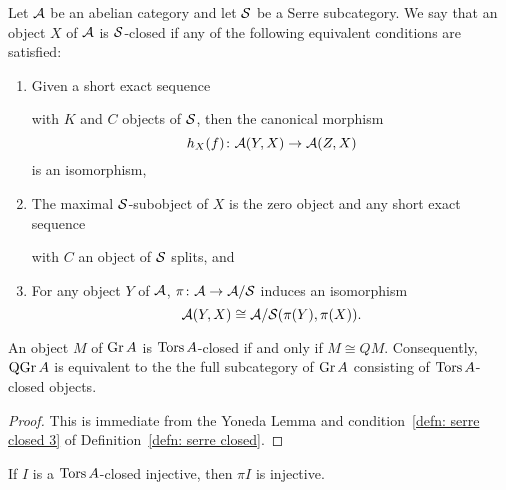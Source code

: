 \begin{definition}\label{defn: serre closed}
  Let \(\mathcal{A}\) be an abelian category and let \(\mathcal{S}\) be a Serre subcategory.
  We say that an object \(X\) of \(\mathcal{A}\) is \(\mathcal{S}\)-closed if any of the following equivalent conditions are satisfied:
  \begin{enumerate}
  \item\label{defn:serre closed 1}
    Given a short exact sequence 
    \begin{center}
    \end{center}
    with $K$ and $C$ objects of $\mathcal{S}$, then the canonical morphism
    $$h_X(f) \colon \mathcal{A}(Y,X) \to \mathcal{A}(Z,X)$$
    is an isomorphism,
  \item\label{defn:serre closed 2}
    The maximal \(\mathcal{S}\)-subobject of $X$ is the zero object and any short exact sequence 
    \begin{center}
    \end{center}
    with $C$ an object of $\mathcal{S}$ splits, and
  \item\label{defn: serre closed 3}
    For any object $Y$ of $\mathcal{A}$, $\pi \colon \mathcal{A} \rightarrow \mathcal{A}/\mathcal{S}$ induces an isomorphism
    $$\mathcal{A}(Y, X) \cong \mathcal{A}/\mathcal{S}(\pi(Y), \pi(X)).$$
  \end{enumerate}
\end{definition}

\begin{lemma}
  An object \(M\) of \(\operatorname{Gr}A\) is \(\operatorname{Tors}A\)-closed if and only if \(M \cong QM\).
  Consequently, \(\operatorname{QGr}A\) is equivalent to the the full subcategory of \(\operatorname{Gr}A\) consisting of \(\operatorname{Tors}A\)-closed objects.
\end{lemma}
\begin{proof}
  This is immediate from the Yoneda Lemma and condition~\ref{defn: serre closed 3} of Definition~\ref{defn: serre closed}.
\end{proof}

\begin{lemma}
  If \(I\) is a \(\operatorname{Tors}A\)-closed injective, then \(\pi{I}\) is injective.
\end{lemma}


